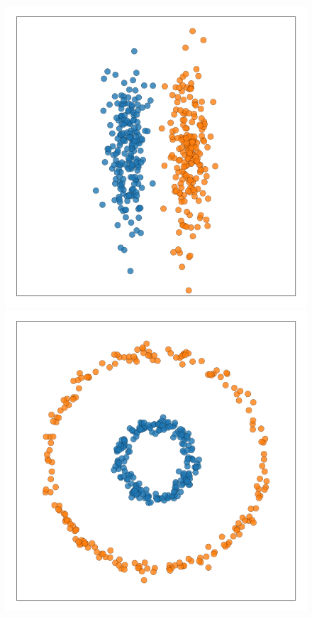 \documentclass{article}
\begin{document}
\begin{figure}
\begin{minipage}{0.33\textwidth}
\hspace{.7cm}\includegraphics[width=.82\textwidth]{cigar_data.pdf}
\end{minipage}
\begin{minipage}{0.33\textwidth}
\hspace{.7cm}\includegraphics[width=.82\textwidth]{circles_data.pdf}
\end{minipage}
\begin{minipage}{0.33\textwidth}

\end{minipage}
\end{figure}
\end{document}
